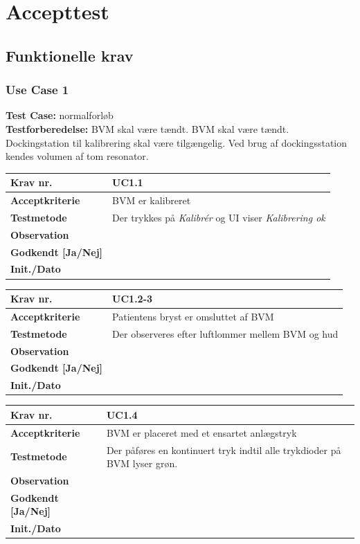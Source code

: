 		\section{Accepttest}

		
\subsection{Funktionelle krav}

\subsubsection{Use Case 1}
\textbf{Test Case:} normalforløb \\
\textbf{Testforberedelse:} BVM skal være tændt. BVM skal være tændt. Dockingstation til kalibrering skal være tilgængelig. Ved brug af dockingsstation kendes volumen af tom resonator. \\

\begin{tabularx}{1\textwidth}{|l|X|}
\hline
\textbf{Krav nr.}              & UC1.1  \\ \hline
\textbf{Acceptkriterie}        & BVM er kalibreret \\ \hline
\textbf{Testmetode}            & Der trykkes på \textit{Kalibrér} og UI viser \textit{Kalibrering ok} \\ \hline
\textbf{Observation}           &  \\ \hline
\textbf{Godkendt {[}Ja/Nej{]}} &  \\ \hline
\textbf{Init./Dato}            &  \\ \hline
\end{tabularx}
				


\begin{tabularx}{1\textwidth}{|l|X|}
\hline
\textbf{Krav nr.}              & UC1.2-3  \\ \hline
\textbf{Acceptkriterie}        & Patientens bryst er omsluttet af BVM \\ \hline
\textbf{Testmetode}            & Der observeres efter luftlommer mellem BVM og hud \\ \hline
\textbf{Observation}           &  \\ \hline
\textbf{Godkendt {[}Ja/Nej{]}} &  \\ \hline
\textbf{Init./Dato}            &  \\ \hline
\end{tabularx}
		

\begin{tabularx}{1\textwidth}{|l|X|}
\hline
\textbf{Krav nr.}              & UC1.4  \\ \hline
\textbf{Acceptkriterie}        & BVM er placeret med et ensartet anlægstryk \\ \hline
\textbf{Testmetode}            & Der påføres en kontinuert tryk indtil alle trykdioder på BVM lyser grøn.  \\ \hline
\textbf{Observation}           &  \\ \hline
\textbf{Godkendt {[}Ja/Nej{]}} &  \\ \hline
\textbf{Init./Dato}            &  \\ \hline
\end{tabularx}
		
